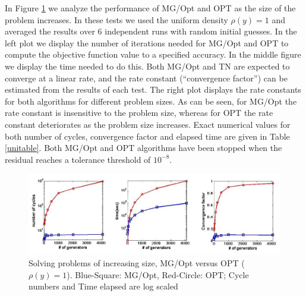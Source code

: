 \documentclass{siamltex}
\begin{document}
In Figure \ref{fig:g_uni} we analyze the performance of MG/Opt and OPT as the size of the problem increases.  In these tests we used the uniform density $\rho(y) = 1$ and averaged the results over 6 independent runs with random initial guesses.  In the left plot we display the number of iterations needed for MG/Opt and OPT to compute the objective function value to a specified accuracy.  In the middle figure we display the time needed to do this.  Both MG/Opt and TN are expected to converge at a linear rate, and the rate constant (``convergence factor'') can be estimated from the results of each test.  The right plot displays the rate constants for both algorithms for different problem sizes.  As can be seen, for MG/Opt the rate constant is insensitive to the problem size, whereas for OPT the rate constant deteriorates as the problem size increases. Exact numerical values for both number of cycles, convergence factor and elapsed time are given in Table \ref{unitable}. Both MG/Opt and OPT algorithms have been stopped when the residual reaches a tolerance threshold of $10^{-8}$.

\begin{figure}[h]
\centering
  \includegraphics[width=1.0\textwidth]{ave_uni_mg_opt1.jpg}
  \caption{Solving problems of increasing size, MG/Opt versus OPT ($\rho(y) = 1$).  Blue-Square: MG/Opt, Red-Circle: OPT; Cycle numbers and Time elapsed are log scaled}
\label{fig:g_uni}
\end{figure}
\end{document}

